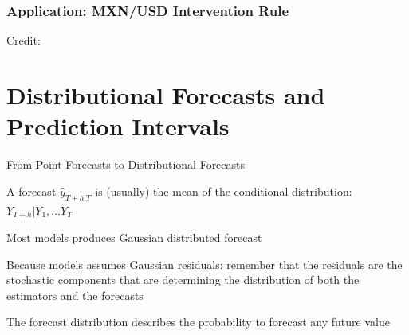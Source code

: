 \documentclass{beamer}
\newenvironment{wideitemize}{\itemize\addtolength{\itemsep}{10pt}}{\enditemize}
\begin{document}
\begin{frame}
  \frametitle{Application: MXN/USD Intervention Rule}
  \hspace*{15pt}\hbox{\scriptsize Credit:}          
\end{frame}

\section{Distributional Forecasts and Prediction Intervals}
\begin{frame}{From Point Forecasts to Distributional Forecasts}

  \begin{wideitemize}
    \item A forecast $\hat{y}_{T+h|T}$ is (usually) the mean of the conditional distribution: $Y_{T+h} | Y_1, \dots Y_T$
    \item Most models produces Gaussian distributed forecast
    \item Because models assumes Gaussian residuals: remember that the residuals are the stochastic components that are determining the distribution of both the estimators and the forecasts
    \item The forecast distribution describes the probability to forecast any future value
  \end{wideitemize}

    
\end{frame}
\end{document}
